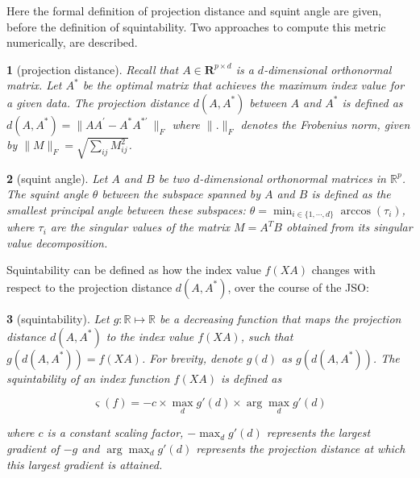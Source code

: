 \documentclass[
  12pt,
]{interact}
\theoremstyle{plain}
\newtheorem{defn}{\protect\definitionname}
\providecommand{\definitionname}{Definition}
\begin{document}
Here the formal definition of projection distance and squint angle are
given, before the definition of squintability. Two approaches to compute
this metric numerically, are described.

\begin{defn}[projection distance]\label{def:proj-dist}
Recall that $A \in \mathbf{R}^{p \times d}$ is a $d$-dimensional orthonormal matrix. Let $A^*$ be the optimal matrix that achieves the maximum index value for a given data. The projection distance $d(A, A^*)$ between $A$ 
and $A^*$ is defined as 
$d(A, A^*) = \lVert AA^\prime - A^*A^{*\prime}\  \rVert _F$
where $\lVert . \rVert _F$ denotes the Frobenius norm, given by
$\lVert M \rVert _F = \sqrt{\sum_{ij} M_{ij}^2}$. 
\end{defn}

\begin{defn}[squint angle]\label{def:squint-angle}
Let $A$ and $B$ be two $d$-dimensional orthonormal matrices in $\mathbb{R}^p$. The squint angle $\theta$ between the subspace spanned by $A$ and $B$ is defined as the smallest principal angle between these subspaces: $\theta = \min_{i \in \{1, \cdots, d\}} \arccos(\tau_i)$, where $\tau_i$ are the singular values of the matrix $M = A^T B$ obtained from its singular value decomposition.

\end{defn}

Squintability can be defined as how the index value \(f(XA)\) changes
with respect to the projection distance \(d(A, A^*)\), over the course
of the JSO:

\begin{defn}[squintability]\label{def:squintability}
Let $g: \mathbb{R} \mapsto  \mathbb{R}$ be a decreasing function that maps the projection distance $d(A, A^*)$ to the index value $f(XA)$, such that $g(d(A, A^*)) = f(XA)$. For brevity, denote $g(d)$ as $g(d(A, A^*))$. The squintability of an index function $f(XA)$ is defined as 

\begin{equation}
\varsigma(f) = -c \times \max_{d} g'(d) \times \arg \max_{d} g'(d)
\label{eq-squintability}
\end{equation}

where $c$ is a constant scaling factor, $-\max_d g'(d)$ represents the 
largest gradient of $-g$ and $\arg \max_{d} g'(d)$ represents the projection distance at which this largest gradient is attained.

\end{defn}
\end{document}
